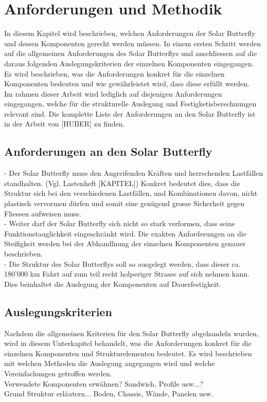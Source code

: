 \section{Anforderungen und Methodik}
In diesem Kapitel wird beschrieben, welchen Anforderungen der Solar Butterfly und dessen Komponenten gerecht werden müssen. In einem ersten Schritt werden auf die allgemeinen Anforderungen des Solar Butterflys und anschliessen auf die daraus folgenden Auslegungskriterien der einzelnen Komponenten eingegangen. Es wird beschrieben, was die Anforderungen konkret für die einzelnen Komponenten bedeuten und wie gewährleistet wird, dass diese erfüllt werden.\\
Im rahmen dieser Arbeit wird lediglich auf diejenigen Anforderungen eingegangen, welche für die strukturelle Auslegung und Festigketisberechnungen relevant sind. Die komplette Liste der Anforderungen an den Solar Butterfly ist in der Arbeit von [HUBER] zu finden.

\subsection{Anforderungen an den Solar Butterfly}
- Der Solar Butterfly muss den Angreifenden Kräften und herrschenden Lastfällen standhalten. (Vgl. Lastenheft [KAPITEL]) Konkret bedeutet dies, dass die Struktur sich bei den verschiedenen Lastfällen, und Kombinationen davon, nicht plastisch vervormen dürfen und somit eine genügend grosse Sicherheit gegen Fliessen aufweisen muss.\\
- Weiter darf der Solar Butterfly sich nicht so stark verformen, dass seine Funktionstauglichkeit eingeschränkt wird. Die exakten Anforderungen an die Steifigkeit werden bei der Abhandlnung der einzelnen Komponenten genauer beschrieben.\\
- Die Struktur des Solar Butterflys soll so ausgelegt werden, dass dieser ca. 180'000 km Fahrt auf zum teil recht holperiger Strasse auf sich nehmen kann. Dies beinhaltet die Auslegung der Komponenten auf Dauerfestigkeit.

\subsection{Auslegungskriterien}
Nachdem die allgemeinen Kriterien für den Solar Butterfly abgehandeln wurden, wird in diesem Unterkapitel behandelt, was die Anforderungen konkret für die einzelnen Komponenten und Strukturelementen bedeutet. Es wird beschrieben mit welchen Methoden die Auslegung angegangen wird und welche Vereinfachungen getroffen werden.\\
Verwendete Komponenten erwähnen? Sandwich, Profile usw...?\\
Grund Struktur erläutern... Boden, Chassis, Wände, Panelen usw.\\

